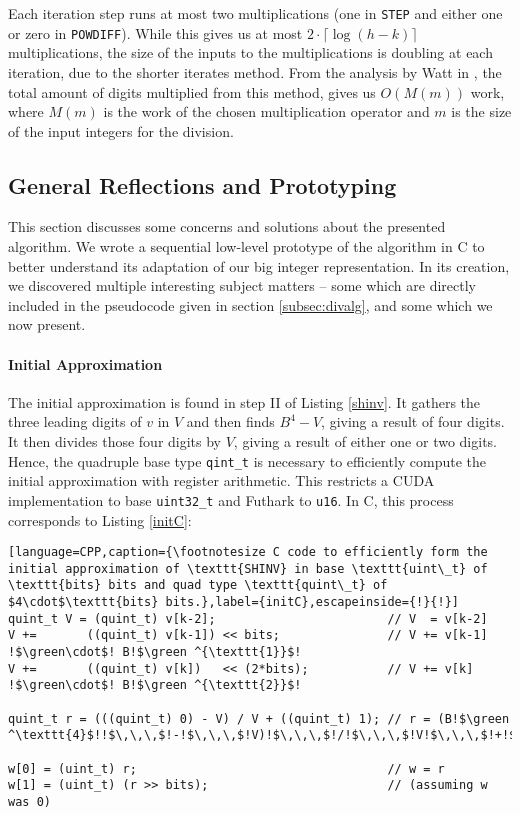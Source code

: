 Each iteration step runs at most two multiplications (one in \texttt{STEP} and
either one or zero in \texttt{POWDIFF}). While this gives us at most
$2 \cdot \lceil \log (h-k) \rceil$ multiplications, the size of the inputs to the
multiplications is doubling at each iteration, due to the shorter iterates
method. From the analysis by Watt in \cite{watt2023efficient}, the total amount
of digits multiplied from this method, gives us $O(M(m))$ work, where $M(m)$ is
the work of the chosen multiplication operator and $m$ is the size of the input
integers for the division.

\pagebreak

\subsection{General Reflections and Prototyping}
\label{subsec:divproto}

This section discusses some concerns and solutions about the presented
algorithm. We wrote a sequential low-level prototype of the algorithm in C to
better understand its adaptation of our big integer representation. In its
creation, we discovered multiple interesting subject matters -- some which are
directly included in the pseudocode given in section \ref{subsec:divalg}, and
some which we now present.

\paragraph{Initial Approximation}
The initial approximation is found in step II of Listing \ref{shinv}. It gathers
the three leading digits of $v$ in $V$ and then finds $B^4-V$, giving a result
of four digits. It then divides those four digits by $V$, giving a result of
either one or two digits. Hence, the quadruple base type \texttt{qint\_t} is
necessary to efficiently compute the initial approximation with register
arithmetic. This restricts a CUDA implementation to base \texttt{uint32\_t} and
Futhark to \texttt{u16}. In C, this process corresponds to Listing \ref{initC}:
\begin{lstlisting}[language=CPP,caption={\footnotesize C code to efficiently form the initial approximation of \texttt{SHINV} in base \texttt{uint\_t} of \texttt{bits} bits and quad type \texttt{quint\_t} of $4\cdot$\texttt{bits} bits.},label={initC},escapeinside={!}{!}]
quint_t V = (quint_t) v[k-2];                        // V  = v[k-2]
V +=       ((quint_t) v[k-1]) << bits;               // V += v[k-1] !$\green\cdot$! B!$\green ^{\texttt{1}}$!
V +=       ((quint_t) v[k])   << (2*bits);           // V += v[k]   !$\green\cdot$! B!$\green ^{\texttt{2}}$!

quint_t r = (((quint_t) 0) - V) / V + ((quint_t) 1); // r = (B!$\green ^\texttt{4}$!!$\,\,\,$!-!$\,\,\,$!V)!$\,\,\,$!/!$\,\,\,$!V!$\,\,\,$!+!$\,\,\,$!1

w[0] = (uint_t) r;                                   // w = r 
w[1] = (uint_t) (r >> bits);                         // (assuming w was 0)
\end{lstlisting}


